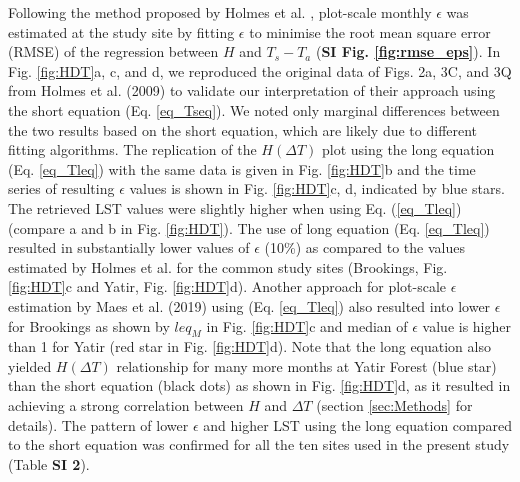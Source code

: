 \documentclass[fleqn,10pt]{wlscirep}
\begin{document}
Following the method proposed by Holmes et al. \cite{holmes_land_2009, holmes_cloud_2016}, plot-scale monthly $\epsilon$ was estimated at the study site by fitting $\epsilon$ to minimise the root mean square error (RMSE) of the regression between $H$ and $T_s - T_a$ (\textbf{SI Fig. \ref{fig:rmse_eps}}). In Fig. \ref{fig:HDT}a, c, and d, we reproduced the original data of Figs. 2a, 3C, and 3Q from Holmes et al. (2009) \cite{holmes_land_2009} to validate our interpretation of their approach using the short equation (Eq. \ref{eq_Tseq}). We noted only marginal differences between the two results based on the short equation, which are likely due to different fitting algorithms. 
The replication of the $H (\Delta T)$ plot using the long equation (Eq. \ref{eq_Tleq}) with the same data is given in Fig. \ref{fig:HDT}b and the time series of resulting $\epsilon$ values is shown in Fig. \ref{fig:HDT}c, d, indicated by blue stars. The retrieved LST values were slightly higher when using Eq. (\ref{eq_Tleq}) (compare a and b in Fig. \ref{fig:HDT}). The use of long equation (Eq. \ref{eq_Tleq}) resulted in substantially lower values of $\epsilon$ (10\%) as compared to the values estimated by Holmes et al.\cite{holmes_land_2009} for the common study sites (Brookings, Fig. \ref{fig:HDT}c and Yatir, Fig. \ref{fig:HDT}d). Another approach for plot-scale $\epsilon$ estimation by Maes et al. (2019) \cite{maes2019potential} using (Eq. \ref{eq_Tleq})  also resulted into lower $\epsilon$ for Brookings as shown by $leq_{M}$ in Fig. \ref{fig:HDT}c and median of $\epsilon$ value is higher than 1 for Yatir (red star in  Fig. \ref{fig:HDT}d). Note that the long equation also yielded $H(\Delta T)$ relationship for many more months at Yatir Forest (blue star) than the short equation (black dots) as shown in Fig. \ref{fig:HDT}d, as it resulted in achieving a strong correlation between $H$ and $\Delta T$ (section \ref{sec:Methods} for details). The pattern of lower $\epsilon$ and higher LST using the long equation compared to the short equation was confirmed for all the ten sites used in the present study (Table \textbf{SI 2}).
\end{document}
